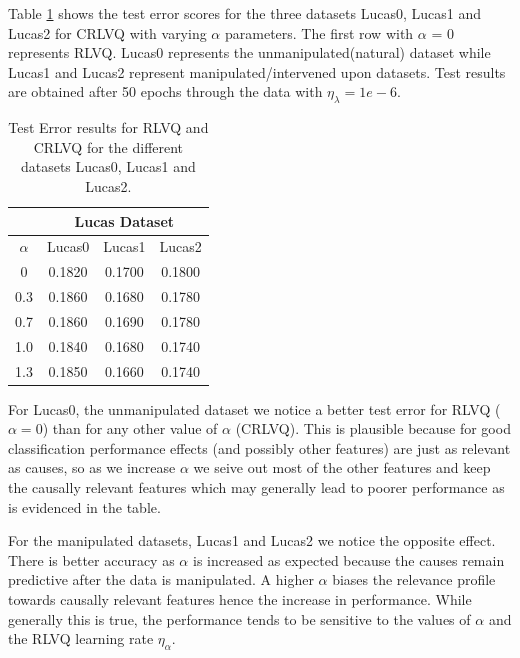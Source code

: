 \documentclass{esannV2}
\begin{document}
Table \ref{tab:TestErrorResults} shows the test error scores for the three datasets Lucas0, Lucas1 and Lucas2 for CRLVQ with varying $\alpha$ parameters. The first row with $\alpha$ = 0 represents RLVQ. Lucas0 represents the unmanipulated(natural) dataset while Lucas1 and Lucas2 represent manipulated/intervened upon datasets. Test results are obtained after 50 epochs through the data with $\eta_\lambda = 1e-6$.


\begin{table}
	\centering
\begin{tabular}{|c|c|c|c|}
\hline
      &         \multicolumn{ 3}{|c|}{Lucas Dataset}   \\
\hline
$\alpha$ &  Lucas0 &     Lucas1 &     Lucas2  \\
\hline
  0    &    0.1820 &     0.1700 &     0.1800  \\
\hline
  0.3 &     0.1860 &     0.1680 &     0.1780  \\
\hline
  0.7 &     0.1860 &     0.1690 &     0.1780   \\
\hline
  1.0 &     0.1840 &     0.1680 &     0.1740   \\
\hline
  1.3 &     0.1850 &     0.1660 &     0.1740   \\
\hline
\end{tabular}   
	\caption{Test Error results for RLVQ and CRLVQ for the different datasets Lucas0, Lucas1 and Lucas2.}
	\label{tab:TestErrorResults}
\end{table}

For Lucas0, the unmanipulated dataset we notice a better test error for RLVQ ($\alpha = 0$) than for any other value of $\alpha$ (CRLVQ). This is plausible because for good classification performance effects (and possibly other features) are just as relevant as causes, so as we increase $\alpha$ we seive out most of the other features and keep the causally relevant features which may generally lead to poorer performance as is evidenced in the table.

For the manipulated datasets, Lucas1 and Lucas2 we notice the opposite effect. There is better accuracy as $\alpha$ is increased as expected because the causes remain predictive after the data is manipulated. A higher $\alpha$ biases the relevance profile towards causally relevant features hence the increase in performance. While generally this is true, the performance tends to be sensitive to the values of $\alpha$ and the RLVQ learning rate $\eta_\alpha$.
\end{document}
